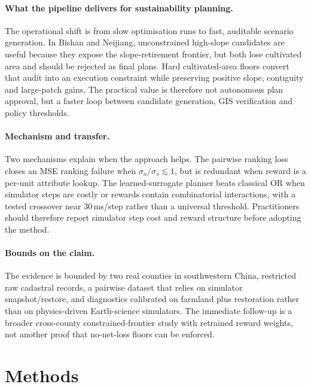 \documentclass[11pt]{article}
\begin{document}
\paragraph{What the pipeline delivers for sustainability planning.} The operational shift is from slow optimisation runs to fast, auditable scenario generation. In Bishan and Neijiang, unconstrained high-slope candidates are useful because they expose the slope-retirement frontier, but both lose cultivated area and should be rejected as final plans. Hard cultivated-area floors convert that audit into an execution constraint while preserving positive slope, contiguity and large-patch gains. The practical value is therefore not autonomous plan approval, but a faster loop between candidate generation, GIS verification and policy thresholds.

\paragraph{Mechanism and transfer.} Two mechanisms explain when the approach helps. The pairwise ranking loss closes an MSE ranking failure when $\sigma_a/\sigma_s \!\lesssim\! 1$, but is redundant when reward is a per-unit attribute lookup. The learned-surrogate planner beats classical OR when simulator steps are costly or rewards contain combinatorial interactions, with a tested crossover near $30$\,ms/step rather than a universal threshold. Practitioners should therefore report simulator step cost and reward structure before adopting the method.

\paragraph{Bounds on the claim.} The evidence is bounded by two real counties in southwestern China, restricted raw cadastral records, a pairwise dataset that relies on simulator snapshot/restore, and diagnostics calibrated on farmland plus restoration rather than on physics-driven Earth-science simulators. The immediate follow-up is a broader cross-county constrained-frontier study with retrained reward weights, not another proof that no-net-loss floors can be enforced.

\section{Methods}
\label{sec:methods}
\end{document}
